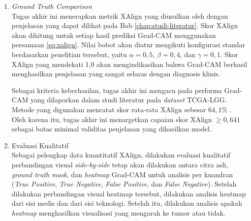 \begin{enumerate}
	\item \textit{Ground Truth Comparison}\\
	Tugas akhir ini menerapkan metrik XAlign yang diusulkan oleh \textcite{muhammad2025heatmap} dengan penjelasan yang dapat dilihat pada Bab \ref{chap:studi-literatur}. Skor XAlign akan dihitung untuk setiap hasil prediksi Grad-CAM menggunakan persamaan \ref{eq:xalign}. Nilai bobot akan diatur mengikuti konfigurasi standar berdasarkan penelitian tersebut, yaitu $\alpha=0,5$, $\beta=0,4$, dan $\gamma=0,1$. Skor XAlign yang mendekati 1,0 akan mengindikasikan bahwa Grad-CAM berhasil menghasilkan penjelasan yang sangat selaras dengan diagnosis klinis.
	
	Sebagai kriteria keberhasilan, tugas akhir ini mengacu pada performa Grad-CAM yang dilaporkan dalam studi literatur pada \textit{dataset} TCGA-LGG. Metode yang digunakan mencatat skor rata-rata XAlign sebesar $64,1\%$ \autocite{muhammad2025heatmap}. Oleh karena itu, tugas akhir ini menargetkan capaian skor XAlign $\geq 0,641$ sebagai batas minimal validitas penjelasan yang dihasilkan model.
	
	\item Evaluasi Kualitatif\\
	Sebagai pelengkap data kuantitatif XAlign, dilakukan evaluasi kualitatif perbandingan visual \textit{side-by-side} tetap akan dilakukan antara citra asli, \textit{ground truth mask}, dan \textit{heatmap} Grad-CAM untuk analisis per kuandran (\textit{True Positive}, \textit{True Negative}, \textit{False Positive}, dan \textit{False Negative}). Setelah dilakukan perbandingan visual heatmap tersebut, dilakukan analisis heatmap dari sisi medis dan dari sisi teknologi. Setelah itu, dilakukan analisis apakah \textit{heatmap} menghasilkan visualisasi yang mengarah ke tumor atau tidak.
\end{enumerate}